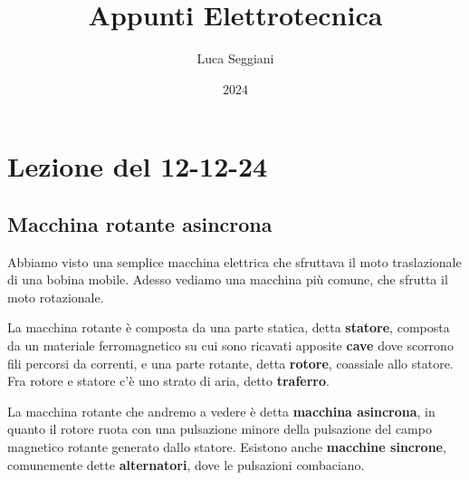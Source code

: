 \documentclass[a4paper,11pt]{article}
\title{Appunti Elettrotecnica}
\author{Luca Seggiani}
\date{2024}
\begin{document}
\section{Lezione del 12-12-24}

\thispagestyle{empty}
\pagestyle{fancy}

\subsection{Macchina rotante asincrona}
Abbiamo visto una semplice macchina elettrica che sfruttava il moto traslazionale di una bobina mobile.
Adesso vediamo una macchina più comune, che sfrutta il moto rotazionale.

La macchina rotante è composta da una parte statica, detta \textbf{statore}, composta da un materiale ferromagnetico su cui sono ricavati apposite \textbf{cave} dove scorrono fili percorsi da correnti, e una parte rotante, detta \textbf{rotore}, coassiale allo statore.
Fra rotore e statore c'è uno strato di aria, detto \textbf{traferro}.

La macchina rotante che andremo a vedere è detta \textbf{macchina asincrona}, in quanto il rotore ruota con una pulsazione minore della pulsazione del campo magnetico rotante generato dallo statore.
Esistono anche \textbf{macchine sincrone}, comunemente dette \textbf{alternatori}, dove le pulsazioni combaciano.
\end{document}
